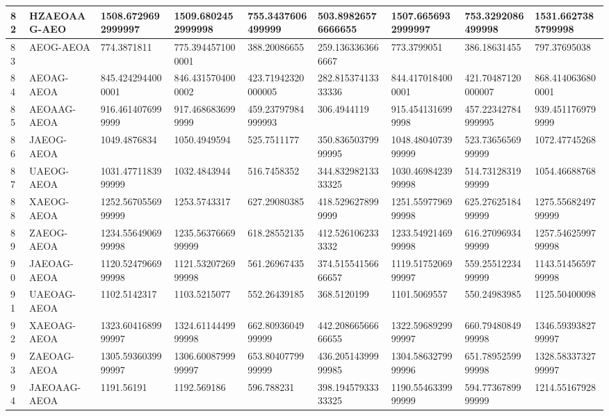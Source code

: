 {\begin{longtable}{|l|l|l|l|l|l|l|l|l|}
        82 & HZAEOAAG-AEO & 1508.6729692999997 & 1509.6802452999998 & 755.3437606499999 & 503.89826576666655 & 1507.6656932999997 & 753.3292086499998 & 1531.6627385799998 \\ \hline
        83 & AEOG-AEOA & 774.3871811 & 775.3944571000001 & 388.20086655 & 259.1363363666667 & 773.3799051 & 386.18631455 & 797.37695038 \\ \hline
        84 & AEOAG-AEOA & 845.4242944000001 & 846.4315704000002 & 423.71942320000005 & 282.81537413333336 & 844.4170184000001 & 421.70487120000007 & 868.4140636800001 \\ \hline
        85 & AEOAAG-AEOA & 916.4614076999999 & 917.4686836999999 & 459.23797984999993 & 306.4944119 & 915.4541316999998 & 457.22342784999995 & 939.4511769799999 \\ \hline
        86 & JAEOG-AEOA & 1049.4876834 & 1050.4949594 & 525.7511177 & 350.83650379999995 & 1048.4804073999999 & 523.7365656999999 & 1072.47745268 \\ \hline
        87 & UAEOG-AEOA & 1031.4771183999999 & 1032.4843944 & 516.7458352 & 344.83298213333325 & 1030.4698423999998 & 514.7312831999999 & 1054.46688768 \\ \hline
        88 & XAEOG-AEOA & 1252.5670556999999 & 1253.5743317 & 627.29080385 & 418.5296278999999 & 1251.5597796999998 & 625.2762518499999 & 1275.5568249799999 \\ \hline
        89 & ZAEOG-AEOA & 1234.5564906999998 & 1235.5637666999999 & 618.28552135 & 412.5261062333332 & 1233.5492146999998 & 616.2709693499999 & 1257.5462599799998 \\ \hline
        90 & JAEOAG-AEOA & 1120.5247966999998 & 1121.5320726999998 & 561.26967435 & 374.51554156666657 & 1119.5175206999997 & 559.2551223499999 & 1143.5145659799998 \\ \hline
        91 & UAEOAG-AEOA & 1102.5142317 & 1103.5215077 & 552.26439185 & 368.5120199 & 1101.5069557 & 550.24983985 & 1125.50400098 \\ \hline
        92 & XAEOAG-AEOA & 1323.6041689999997 & 1324.6114449999998 & 662.8093604999999 & 442.20866566666655 & 1322.5968929999997 & 660.7948084999998 & 1346.5939382799997 \\ \hline
        93 & ZAEOAG-AEOA & 1305.5936039999997 & 1306.6008799999997 & 653.8040779999999 & 436.20514399999985 & 1304.5863279999996 & 651.7895259999998 & 1328.5833732799997 \\ \hline
        94 & JAEOAAG-AEOA & 1191.56191 & 1192.569186 & 596.788231 & 398.19457933333325 & 1190.5546339999999 & 594.7736789999999 & 1214.55167928 \\ \hline

\end{longtable}}

